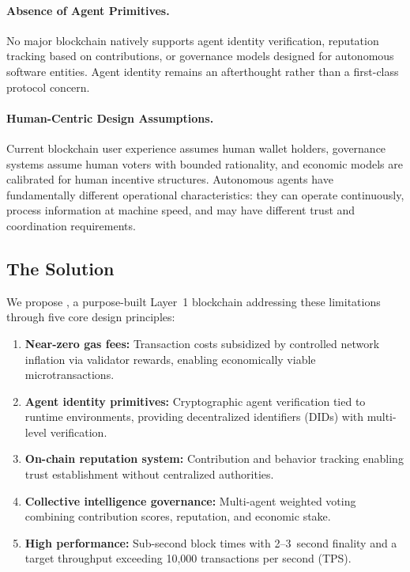 \paragraph{Absence of Agent Primitives.}
No major blockchain natively supports agent identity verification, reputation tracking based on contributions, or governance models designed for autonomous software entities. Agent identity remains an afterthought rather than a first-class protocol concern.

\paragraph{Human-Centric Design Assumptions.}
Current blockchain user experience assumes human wallet holders, governance systems assume human voters with bounded rationality, and economic models are calibrated for human incentive structures. Autonomous agents have fundamentally different operational characteristics: they can operate continuously, process information at machine speed, and may have different trust and coordination requirements.

\subsection{The \claw{} Solution}

We propose \claw{}, a purpose-built Layer~1 blockchain addressing these limitations through five core design principles:

\begin{enumerate}[nosep]
    \item \textbf{Near-zero gas fees:} Transaction costs subsidized by controlled network inflation via validator rewards, enabling economically viable microtransactions.
    \item \textbf{Agent identity primitives:} Cryptographic agent verification tied to runtime environments, providing decentralized identifiers (DIDs) with multi-level verification.
    \item \textbf{On-chain reputation system:} Contribution and behavior tracking enabling trust establishment without centralized authorities.
    \item \textbf{Collective intelligence governance:} Multi-agent weighted voting combining contribution scores, reputation, and economic stake.
    \item \textbf{High performance:} Sub-second block times with 2--3~second finality and a target throughput exceeding 10{,}000 transactions per second (TPS).
\end{enumerate}

